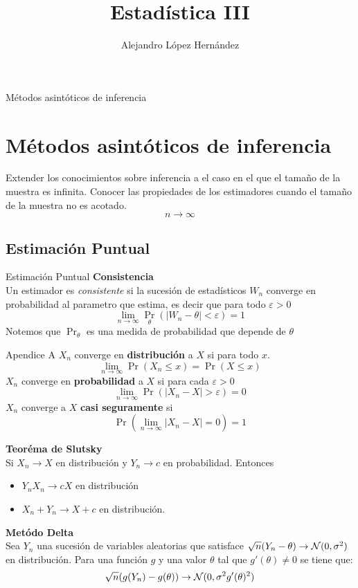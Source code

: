 \documentclass{beamer}
\author[Alejandro López]{Alejandro López Hernández}
\institute[FES Acatlán UNAM ]
{ FES Acatlán\\
  Universidad Nacional Autónoma de México }
\title{Estadística III}
\begin{document}
\frame{\titlepage}
\frame{\tableofcontents}
\begin{frame}{Métodos asintóticos de inferencia}
\section{Métodos asintóticos de inferencia}
Extender los conocimientos sobre inferencia a el caso en el que el tamaño de la muestra es infinita. Conocer las propiedades de los estimadores cuando el tamaño de la muestra no es acotado.$$n\rightarrow \infty$$
\end{frame}
\subsection{Estimación Puntual}
\begin{frame}{Estimación Puntual}
\textbf{Consistencia}\\
Un estimador es \textit{consistente} si la sucesión de estadísticos $W_n$ converge en probabilidad al parametro que estima, es decir que para todo $\varepsilon>0$ $$\lim_{n\rightarrow \infty}\Pr_{\theta}(|W_n-\theta|<\varepsilon)=1$$
Notemos que $\Pr_{\theta}$ es una medida de probabilidad que depende de $\theta$ 
\end{frame}
\appendix
\begin{frame}{Apendice A} 
$X_n$ converge en \textbf{distribución} a $X$ si para todo $x$. $$\lim_{n\rightarrow \infty}\Pr(X_n\le x)=\Pr(X\le x)$$ $X_n$ converge en \textbf{probabilidad} a $X$ si para cada $\varepsilon>0$ $$\lim_{n\rightarrow \infty}\Pr(|X_n-X|>\varepsilon) =0$$
$X_n$ converge a $X$ \textbf{casi seguramente} si $$\Pr(\lim_{n\rightarrow \infty}|X_n-X|=0)=1$$
\end{frame}
\begin{frame}
\textbf{Teoréma de Slutsky}\\
Si $X_n\rightarrow X$ en distribución y $Y_n\rightarrow c$ en probabilidad. Entonces 
\begin{itemize}
\item $Y_n X_n\rightarrow cX$ en distribución
\item $X_n+Y_n\rightarrow X+c$ en distribución.

\end{itemize}

\textbf{Metódo Delta}\\
Sea $Y_n$ una sucesión de variables aleatorias que satisface $\sqrt{n}(Y_n-\theta)\rightarrow {\mathcal N} (0,\sigma^2)$ en distribución. Para una función $g$ y una valor $\theta$ tal que $g'(\theta)\neq 0$ se tiene que: $$\sqrt{n}(g(Y_n)-g(\theta))\rightarrow {\mathcal N}(0,\sigma^2 g'(\theta)^2)$$
\end{frame}
\end{document}
